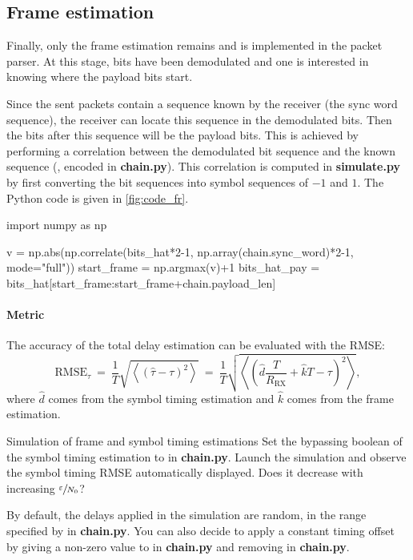 \subsection{Frame estimation}
Finally, only the frame estimation remains and is implemented in the packet parser. At this stage, bits have been demodulated and one is interested in knowing where the payload bits start.

Since the sent packets contain a sequence known by the receiver (the sync word sequence), the receiver can locate this sequence in the demodulated bits. Then the bits after this sequence will be the payload bits. This is achieved by performing a correlation between the demodulated bit sequence and the known sequence (, encoded in \textbf{chain.py}). This correlation is computed in \textbf{simulate.py} by first converting the bit sequences into symbol sequences of $-1$ and $1$. The Python code is given in \autoref{fig:code_fr}.
\begin{listing}[H]
\begin{python}
import numpy as np

v = np.abs(np.correlate(bits_hat*2-1, np.array(chain.sync_word)*2-1, mode="full"))
start_frame = np.argmax(v)+1
bits_hat_pay = bits_hat[start_frame:start_frame+chain.payload_len]

\end{python}
\caption{Python code for frame estimation (from \textbf{simulate.py}).}
\label{fig:code_fr}
\end{listing}

\paragraph{Metric} The accuracy of the total delay estimation can be evaluated with the RMSE:
\begin{equation*}
    \text{RMSE}_{\tau}\:=\:\frac{1}{T}\sqrt{\left\langle\left(\hat{\tau}-\tau\right)^2\right\rangle}\:=\:\frac{1}{T}\sqrt{\left\langle\left(\hat{d}\frac{T}{R_{\text{RX}}}+\hat{k}T-\tau\right)^2\right\rangle},
\end{equation*}
where $\hat{d}$ comes from the symbol timing estimation and $\hat{k}$ comes from the frame estimation.



\begin{bclogo}[couleur = gray!20, arrondi = 0.2, logo=\bccrayon]{Simulation of frame and symbol timing estimations}
Set the bypassing boolean of the symbol timing estimation to  in \textbf{chain.py}. Launch the simulation and observe the symbol timing RMSE automatically displayed. Does it decrease with increasing $\sfrac{\varepsilon}{N_0}$?

By default, the delays applied in the simulation are random, in the range specified by  in \textbf{chain.py}. You can also decide to apply a constant timing offset by giving a non-zero value to  in \textbf{chain.py} and removing  in \textbf{chain.py}.

\end{bclogo}
